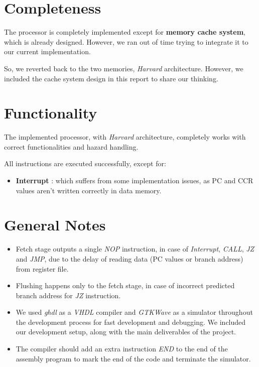 \section{Completeness}
The processor is completely implemented except for \textbf{memory cache system}, which is already designed. However, we ran out of time trying to integrate it to our current implementation.

So, we reverted back to the two memories, \emph{Harvard} architecture. However, we included the cache system design in this report to share our thinking.

\section{Functionality}
The implemented processor, with \emph{Harvard} architecture, completely works with correct functionalities and hazard handling.

All instructions are executed successfully, except for:
\begin{itemize}
    \item \textbf{Interrupt} : which suffers from some implementation issues, as PC and CCR values aren't written correctly in data memory.
\end{itemize}

\section{General Notes}
\begin{itemize}
    \item Fetch stage outputs a single \emph{NOP} instruction, in case of \emph{Interrupt}, \emph{CALL}, \emph{JZ} and \emph{JMP}, due to the delay of reading data (PC values or branch address) from register file.
    \item Flushing happens only to the fetch stage, in case of incorrect predicted branch address for \emph{JZ} instruction.
    \item We used \emph{ghdl} as a \emph{VHDL} compiler and \emph{GTKWave} as a simulator throughout the development process for fast development and debugging. We included our development setup, along with the main deliverables of the project. 
    \item The compiler should add an extra instruction \emph{END} to the end of the assembly program to mark the end of the code and terminate the simulator.
\end{itemize}